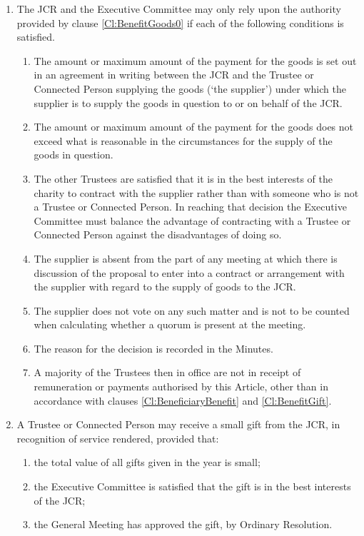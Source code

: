 \documentclass[11pt,a4paper, oneside]{memoir}
\begin{document}
\begin{enumerate}
		\item \label{Cl:BenefitGoods} The JCR and the Executive Committee may only rely upon the authority provided by clause \ref{Cl:BenefitGoods0} if each of the following conditions is satisfied.
		\begin{enumerate}
			\item The amount or maximum amount of the payment for the goods is set out in an agreement in writing between the JCR and the Trustee or Connected Person supplying the goods (`the supplier') under which the supplier is to supply the goods in question to or on behalf of the JCR.
			\item The amount or maximum amount of the payment for the goods does not exceed what is reasonable in the circumstances for the supply of the goods in question.
			\item The other Trustees are satisfied that it is in the best interests of the charity to contract with the supplier rather than with someone who is not a Trustee or Connected Person.
			In reaching that decision the Executive Committee must balance the advantage of contracting with a Trustee or Connected Person against the disadvantages of doing so.
			\item The supplier is absent from the part of any meeting at which there is discussion of the proposal to enter into a contract or arrangement with the supplier with regard to the supply of goods to the JCR.
			\item The supplier does not vote on any such matter and is not to be counted when calculating whether a quorum is present at the meeting.
			\item The reason for the decision is recorded in the Minutes.
			\item A majority of the Trustees then in office are not in receipt of remuneration or payments authorised by this Article, other than in accordance with clauses \ref{Cl:BeneficiaryBenefit} and \ref{Cl:BenefitGift}.
		\end{enumerate}
		\item \label{Cl:BenefitGift} A Trustee or Connected Person may receive a small gift from the JCR, in recognition of service rendered, provided that:
		\begin{enumerate}
			\item the total value of all gifts given in the year is small;
			\item the Executive Committee is satisfied that the gift is in the best interests of the JCR;
			\item the General Meeting has approved the gift, by Ordinary Resolution.

\end{enumerate}
\end{enumerate}
\end{document}
